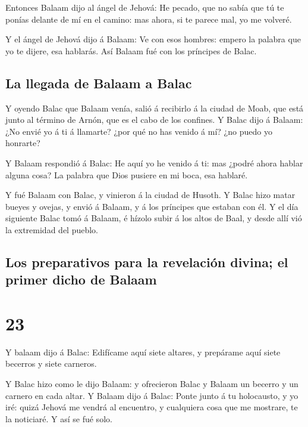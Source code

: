  Entonces Balaam dijo al ángel de Jehová: He pecado, que no
sabía que tú te ponías delante de mí en el camino: mas ahora, si te
parece mal, yo me volveré.

 Y el ángel de Jehová dijo á Balaam: Ve con esos hombres:
empero la palabra que yo te dijere, esa hablarás. Así Balaam fué con los
príncipes de Balac.

\hypertarget{la-llegada-de-balaam-a-balac}{%
\subsection{La llegada de Balaam a
Balac}\label{la-llegada-de-balaam-a-balac}}

 Y oyendo Balac que Balaam venía, salió á recibirlo á la
ciudad de Moab, que está junto al término de Arnón, que es el cabo de
los confines.  Y Balac dijo á Balaam: ¿No envié yo á ti á
llamarte? ¿por qué no has venido á mí? ¿no puedo yo honrarte?

 Y Balaam respondió á Balac: He aquí yo he venido á ti: mas
¿podré ahora hablar alguna cosa? La palabra que Dios pusiere en mi boca,
esa hablaré.

 Y fué Balaam con Balac, y vinieron á la ciudad de Husoth.
 Y Balac hizo matar bueyes y ovejas, y envió á Balaam, y á
los príncipes que estaban con él.  Y el día siguiente Balac
tomó á Balaam, é hízolo subir á los altos de Baal, y desde allí vió la
extremidad del pueblo.

\hypertarget{los-preparativos-para-la-revelaciuxf3n-divina-el-primer-dicho-de-balaam}{%
\subsection{Los preparativos para la revelación divina; el primer dicho
de
Balaam}\label{los-preparativos-para-la-revelaciuxf3n-divina-el-primer-dicho-de-balaam}}

\hypertarget{section-22}{%
\section{23}\label{section-22}}

 Y balaam dijo á Balac: Edifícame aquí siete altares, y
prepárame aquí siete becerros y siete carneros.

 Y Balac hizo como le dijo Balaam: y ofrecieron Balac y
Balaam un becerro y un carnero en cada altar.  Y Balaam dijo
á Balac: Ponte junto á tu holocausto, y yo iré: quizá Jehová me vendrá
al encuentro, y cualquiera cosa que me mostrare, te la noticiaré. Y así
se fué solo.

